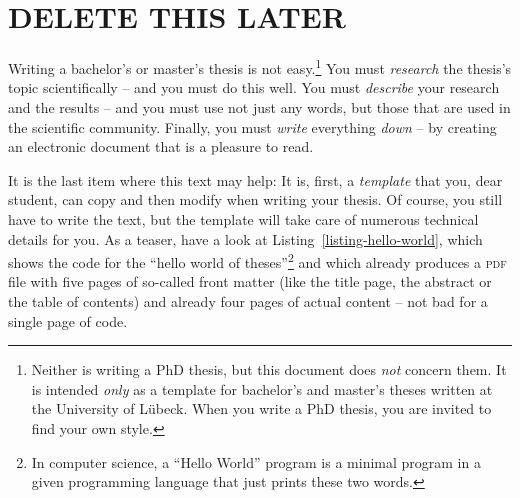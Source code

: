 \documentclass[english,version-2020-11]{uzl-thesis}
\begin{document}
%
%

\chapter{DELETE THIS LATER}

%

Writing a bachelor's or master's thesis is not easy.\footnote{Neither
  is writing a PhD thesis, but this document does \emph{not} concern
  them. It is intended \emph{only} as a template for bachelor's and
  master's theses written at the University of Lübeck. When you write
  a PhD thesis, you are invited to find your own style.} You must
\emph{research} the thesis's topic scientifically 
-- and you must do 
this well. You must \emph{describe} your research and the results --
and you must use not just any words, but those that are used in the
scientific community. Finally, you must \emph{write} everything
\emph{down} -- by creating an electronic document that is a pleasure
to read.

It is the last item where this text may help: It is, first, a
\emph{template} that you, dear student, can copy and then modify when
writing your thesis. Of course, you still have to write the text, but
the template will take care of numerous technical details for you. As
a teaser, have a look at Listing~\vref{listing-hello-world}, which 
shows the code for the ``hello world of theses''\footnote{In computer
  science, a ``Hello World'' program is a minimal program in a given
  programming language that   just prints these two words.} and which
already produces a \textsc{pdf} file with five pages of so-called front
matter (like the title page, the abstract or the table of contents)
and already four pages of actual content -- not bad for a single page
of code.
\end{document}
